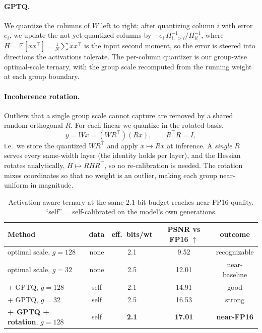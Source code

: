 \documentclass[11pt]{article}
\begin{document}
\paragraph{GPTQ.} We quantize the columns of $W$ left to right; after quantizing
column $i$ with error $e_i$, we update the not-yet-quantized columns by
$-e_i\,H^{-1}_{i,\,>i}/H^{-1}_{ii}$, where $H=\mathbb{E}[xx^\top]=\tfrac1N\sum xx^\top$
is the input second moment, so the error is steered into directions the
activations tolerate. The per-column quantizer is our group-wise optimal-scale
ternary, with the group scale recomputed from the running weight at each group
boundary.

\paragraph{Incoherence rotation.} Outliers that a single group scale cannot
capture are removed by a shared random orthogonal $R$. For each linear we quantize
in the rotated basis,
\begin{equation}
  y = Wx = (WR^\top)(Rx),\qquad R^\top R = I,
\end{equation}
i.e.\ we store the quantized $WR^\top$ and apply $x\mapsto Rx$ at inference. A
\emph{single} $R$ serves every same-width layer (the identity holds per layer), and
the Hessian rotates analytically, $H\mapsto RHR^\top$, so no re-calibration is
needed. The rotation mixes coordinates so that no weight is an outlier, making each
group near-uniform in magnitude.

\begin{table}[h]
\centering
\begin{tabular}{lcccc}
\toprule
Method & data & eff.\ bits/wt & PSNR vs FP16 $\uparrow$ & outcome\\
\midrule
optimal scale, $g{=}128$            & none & 2.1 & 9.52  & recognizable\\
optimal scale, $g{=}32$             & none & 2.5 & 12.01 & near-baseline\\
\;+ GPTQ, $g{=}128$                 & self & 2.1 & 14.91 & good\\
\;+ GPTQ, $g{=}32$                  & self & 2.5 & 16.53 & strong\\
\textbf{+ GPTQ + rotation}, $g{=}128$ & self & \textbf{2.1} & \textbf{17.01} & \textbf{near-FP16}\\
\bottomrule
\end{tabular}
\caption{Activation-aware ternary at the same $2.1$-bit budget reaches near-FP16
quality. ``self'' = self-calibrated on the model's own generations.}
\end{table}
\end{document}
